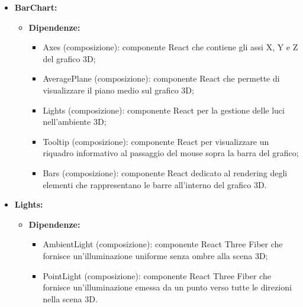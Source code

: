 \begin{itemize}
      \item \textbf{BarChart:}
            \begin{itemize}
                  \item \textbf{Dipendenze:}
                        \begin{itemize}
                              \item Axes (composizione): componente React che contiene gli assi X, Y e Z del
                                    grafico 3D;
                              \item AveragePlane (composizione): componente React che permette di visualizzare il
                                    piano medio sul grafico 3D;
                              \item Lights (composizione): componente React per la gestione delle luci
                                    nell'ambiente 3D;
                              \item Tooltip (composizione): componente React per visualizzare un riquadro
                                    informativo al passaggio del mouse sopra la barra del grafico;
                              \item Bars (composizione): componente React dedicato al rendering degli elementi che
                                    rappresentano le barre all'interno del grafico 3D.
                        \end{itemize}
            \end{itemize}
      \item \textbf{Lights:}
            \begin{itemize}
                  \item \textbf{Dipendenze:}
                        \begin{itemize}
                              \item AmbientLight (composizione): componente React Three Fiber che fornisce
                                    un'illuminazione uniforme senza ombre alla scena 3D;
                              \item PointLight (composizione): componente React Three Fiber che fornisce
                                    un'illuminazione emessa da un punto verso tutte le direzioni nella scena 3D.
                        \end{itemize}
            \end{itemize}
\end{itemize}

